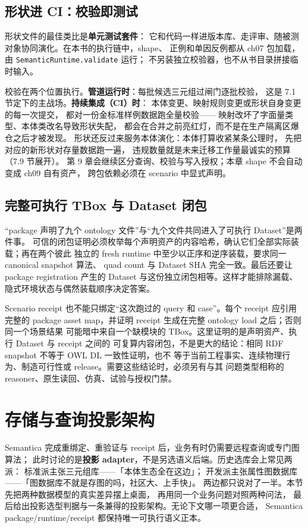 \subsection{形状进 CI：校验即测试}

形状文件的最佳类比是\textbf{单元测试套件}：
它和代码一样进版本库、走评审、随被测对象协同演化。在本书的执行链中，shape、
正例和单因反例都从 ch07 包加载，由 \texttt{SemanticRuntime.validate} 运行；
不另装独立校验器，也不从书目录拼接临时输入。

校验在两个位置执行。\textbf{管道运行时}：每批候选三元组过闸门逐批校验，
这是 7.1 节定下的主战场。\textbf{持续集成（CI）时}：
本体变更、映射规则变更或形状自身变更的每一次提交，
都对一份金标准样例数据跑全量校验——
映射改坏了字面量类型、本体类改名导致形状失配，
都会在合并之前亮红灯，而不是在生产隔离区爆仓之后才被发现。
形状还反过来服务本体演化：本体打算收紧某条公理时，
先把对应的新形状对存量数据跑一遍，
违规数量就是未来迁移工作量最诚实的预算（7.9 节展开）。
第 9 章会继续区分查询、校验与写入授权；本章 shape 不会自动变成 ch09 自有资产，
跨包依赖必须在 scenario 中显式声明。

\subsection{完整可执行 TBox 与 Dataset 闭包}

“package 声明了九个 ontology 文件”与“九个文件共同进入了可执行 Dataset”是两件事。
可信的闭包证明必须枚举每个声明资产的内容哈希，确认它们全部实际装载；再在两个彼此
独立的 fresh runtime 中至少以正序和逆序装载，要求同一 canonical snapshot 算法、
quad count 与 Dataset SHA 完全一致。最后还要让 package registration 产生的 Dataset
与这份独立闭包相等。这样才能排除漏载、隐式环境状态与偶然装载顺序决定答案。

Scenario receipt 也不能只绑定“这次跑过的 query 和 case”。每个 receipt 应引用完整的
package asset map，并证明 receipt 生成在完整 ontology load 之后；否则同一个场景结果
可能暗中来自一个缺模块的 TBox。这里证明的是声明资产、执行 Dataset 与 receipt 之间的
可复算内容闭包，不是更大的结论：相同 RDF snapshot 不等于 OWL DL 一致性证明，也不
等于当前工程事实、连续物理行为、制造可行性或 release。需要这些结论时，必须另有与其
问题类型相称的 reasoner、原生读回、仿真、试验与授权门禁。

\section{存储与查询投影架构}

Semantica 完成重绑定、重验证与 receipt 后，业务有时仍需要远程查询或专门图算法；
此时讨论的是\textbf{投影 adapter}，不是另选语义后端。历史选库会上常见两派：
标准派主张三元组库——「本体生态全在这边」；
开发派主张属性图数据库——「图数据库不就是存图的吗，社区大、上手快」。
两边都只说对了一半。本节先把两种数据模型的真实差异摆上桌面，
再用同一个业务问题对照两种问法，
最后给出投影选型判据与一条兼得的投影架构。无论下文哪一项更合适，
Semantica package/runtime/receipt 都保持唯一可执行语义正本。

